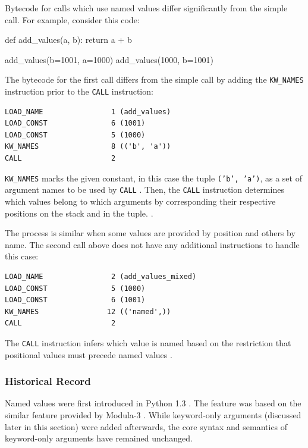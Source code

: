 Bytecode for calls which use named values differ significantly from the simple call.
For example, consider this code:

\begin{pygmented}[lang=python]
def add_values(a, b):
    return a + b

add_values(b=1001, a=1000)
add_values(1000, b=1001)
\end{pygmented}

The bytecode for the first call differs from the simple call by adding the
\texttt{KW\_NAMES} instruction prior to the \texttt{CALL} instruction:

\begin{verbatim}
LOAD_NAME                1 (add_values)
LOAD_CONST               6 (1001)
LOAD_CONST               5 (1000)
KW_NAMES                 8 (('b', 'a'))
CALL                     2
\end{verbatim}

\texttt{KW\_NAMES} marks the given constant, in this case the tuple \texttt{('b', 'a')},
as a set of argument names to be used by \texttt{CALL}
\parencite[][Python/bytecodes.c lines 2601-2605, 2644, 2869-2692, 2706-2709]{python-source}.
Then, the \texttt{CALL} instruction determines which values belong to which arguments by
corresponding their respective positions on the stack and in the tuple.
\parencite[][Python/ceval.c lines 1383-1384]{python-source}.

The process is similar when some values are provided by position and others by name.
The second call above does not have any additional instructions to handle this case:

\begin{verbatim}
LOAD_NAME                2 (add_values_mixed)
LOAD_CONST               5 (1000)
LOAD_CONST               6 (1001)
KW_NAMES                12 (('named',))
CALL                     2
\end{verbatim}

The \texttt{CALL} instruction infers which value is named based on the restriction that
positional values must precede named values
\parencite[][Python/ceval.c lines 1383-1384]{python-source}.

\subsubsection{Historical Record}
Named values were first introduced in Python 1.3
\parencite[][Doc/tut.tex lines 3540-3626]{python-source-1.3}.
The feature was based on the similar feature provided by Modula-3
\parencite[][Doc/tut.tex lines 3584-3586]{python-source-1.3}.
While keyword-only arguments (discussed later in this section) were added afterwards, the
core syntax and semantics of keyword-only arguments have remained unchanged.

